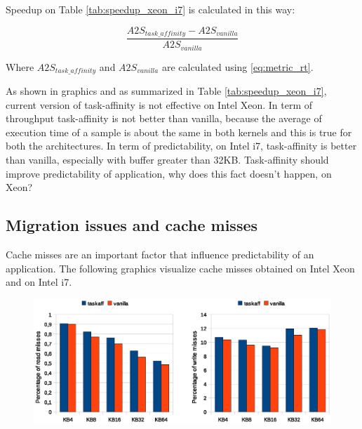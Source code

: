 Speedup on Table \ref{tab:speedup_xeon_i7} is calculated in this way:

\begin{equation}
        \frac{A2S_{task\_affinity} - A2S_{vanilla}}{A2S_{vanilla}}
\label{eq:miss_rate}
\end{equation}

Where $A2S_{task\_affinity}$ and $A2S_{vanilla}$ are calculated using \ref{eq:metric_rt}.

As shown in graphics and as summarized in Table \ref{tab:speedup_xeon_i7}, current version of task-affinity is not effective on Intel Xeon.
In term of throughput task-affinity is not better than vanilla, because the average of execution time of a sample is about the same in both kernels and this
is true for both the architectures. In term of predictability, on Intel i7, task-affinity is better than vanilla, especially with buffer greater than 32KB.
Task-affinity should improve predictability of application, why does this fact doesn't happen, on Xeon?

\subsection{Migration issues and cache misses}

Cache misses are an important factor that influence predictability of an application. The following graphics visualize cache misses obtained on Intel 
Xeon and on Intel i7.

\begin{figure}[htbp]
 \centering
  \includegraphics[width=\widefigure]{images/cache_miss/l1_load_store_Xeon.eps}
  \label{fig:l1_load_store_Xeon}
 \caption{}
\end{figure}

